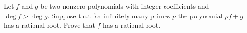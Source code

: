 Let 
$f$
 and 
$g$
 be two nonzero polynomials with integer coefficients and 
$\deg f>\deg g$.
  Suppose that for infinitely many primes 
$p$
 the polynomial 
$pf+g$
 has a rational root. Prove that 
$f$
 has a rational root.
